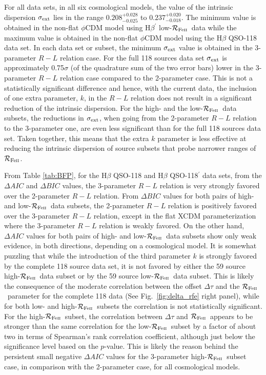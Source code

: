 \documentclass[a4paper,fleqn,usenatbib]{mnras}
\newcommand{\rfe}{${\cal R}_{\rm{Fe\textsc{ii}}}$}
\begin{document}
For all data sets, in all six cosmological models, the value of the intrinsic dispersion $\sigma_{\rm ext}$ lies in the range $0.208^{+0.028}_{-0.025}$ to $0.237^{+0.020}_{-0.018}$. The minimum value is obtained in the non-flat $\phi$CDM model using H$\beta^{\prime}$ low-\rfe\ data while the maximum value is obtained in the non-flat $\phi$CDM model using the H$\beta$ QSO-118 data set. In each data set or subset, the minimum $\sigma_{\rm ext}$ value is obtained in the 3-parameter $R-L$ relation case. For the full 118 sources data set $\sigma_{\rm ext}$ is approximately 0.75$\sigma$ (of the quadrature sum of the two error bars) lower in the 3-parameter $R-L$ relation case compared to the 2-parameter case. This is not a statistically significant difference and hence, with the current data, the inclusion of one extra parameter, $k$, in the $R-L$ relation does not result in a significant reduction of the intrinsic dispersion. For the high- and the low-\rfe\ data subsets, the reductions in $\sigma_{\rm ext}$, when going from the 2-parameter $R-L$ relation to the 3-parameter one, are even less significant than for the full 118 sources data set. Taken together, this means that the extra $k$ parameter is less effective at reducing the intrinsic dispersion of source subsets that probe narrower ranges of \rfe.    

From Table \ref{tab:BFP}, for the H$\beta$ QSO-118 and H$\beta$ QSO-118$^{\prime}$ data sets, from the $\Delta AIC$ and $\Delta BIC$ values, the 3-parameter $R-L$ relation is very strongly favored over the 2-parameter $R-L$ relation. From $\Delta BIC$ values for both pairs of high- and low-\rfe\ data subsets, the 2-parameter $R-L$ relation is positively favored over the 3-parameter $R-L$ relation, except in the flat XCDM parameterization where the 3-parameter $R-L$ relation is weakly favored. On the other hand, $\Delta AIC$ values for both pairs of high- and low-\rfe\ data subsets show only weak evidence, in both directions, depending on a cosmological model. It is somewhat puzzling that while the introduction of the third parameter $k$ is strongly favored by the complete 118 source data set, it is not favored by either the 59 source high-\rfe\ data subset or by the 59 source low-\rfe\ data subset. This is likely the consequence of the moderate correlation between the offset $\Delta \tau$ and the \rfe\ parameter for the complete 118 data (See Fig.~\ref{fig:delta_rfe} right panel), while for both low- and high-\rfe\ subsets the correlation is not statistically significant. For the high-\rfe\ subset, the correlation between $\Delta \tau$ and \rfe\ appears to be stronger than the same correlation for the low-\rfe\ subset by a factor of about two in terms of Spearman's rank correlation coefficient, although just below the significance level based on the $p$-value. This is likely the reason behind the persistent small negative $\Delta AIC$ values for the 3-parameter high-\rfe\ subset case, in comparison with the 2-parameter case, for all cosmological models.
\end{document}
